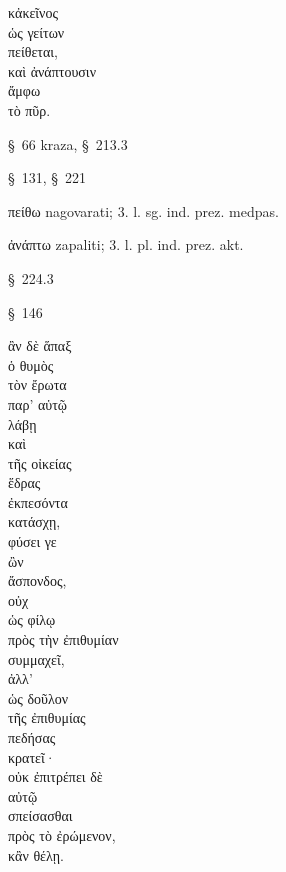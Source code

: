 

{\large
\begin{greek}
\noindent κἀκεῖνος \\
\tabto{2em} ὡς γείτων \\
πείθεται, \\
καὶ ἀνάπτουσιν \\
ἄμφω \\
τὸ πῦρ.\\

\end{greek}
}

\begin{description}[noitemsep]
\item[κἀκεῖνος ] §~66 kraza, §~213.3
\item[ὡς γείτων ] §~131, §~221
\item[πείθεται] πείθω nagovarati; 3. l. sg. ind. prez. medpas.
\item[ἀνάπτουσιν ] ἀνάπτω zapaliti; 3. l. pl. ind. prez. akt.
\item[ἄμφω ] §~224.3
\item[τὸ πῦρ] §~146

\end{description}



{\large
\begin{greek}
\noindent ἂν δὲ ἅπαξ \\
ὁ θυμὸς \\
τὸν ἔρωτα \\
\tabto{2em} παρ' αὑτῷ \\
λάβῃ \\
καὶ \\
\tabto{2em} τῆς οἰκείας \\
\tabto{2em} ἕδρας \\
ἐκπεσόντα \\
κατάσχῃ, \\
φύσει γε \\
ὢν \\
\tabto{2em} ἄσπονδος, \\
οὐχ \\
\tabto{2em} ὡς φίλῳ \\
\tabto{2em} πρὸς τὴν ἐπιθυμίαν \\
συμμαχεῖ, \\
ἀλλ' \\
\tabto{2em} ὡς δοῦλον \\
\tabto{2em} \tabto{2em} τῆς ἐπιθυμίας \\
πεδήσας \\
κρατεῖ· \\
οὐκ ἐπιτρέπει δὲ \\
\tabto{2em} αὐτῷ \\
\tabto{2em} σπείσασθαι \\
\tabto{2em} πρὸς τὸ ἐρώμενον, \\
κἂν θέλῃ.\\

\end{greek}
}

